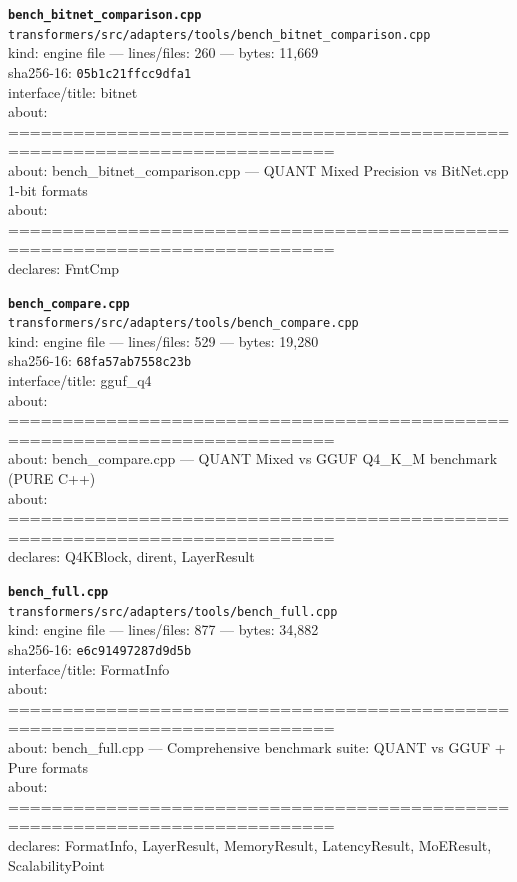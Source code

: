 \noindent\textbf{\texttt{bench\_bitnet\_comparison.cpp}}\\
\texttt{transformers/src/adapters/tools/bench\_bitnet\_comparison.cpp}\\
kind: engine file --- lines/files: 260 --- bytes: 11,669\\
sha256-16: \texttt{05b1c21ffcc9dfa1}\\
interface/title: bitnet\\
about: ============================================================================\\
about: bench\_bitnet\_comparison.cpp — QUANT Mixed Precision vs BitNet.cpp 1-bit formats\\
about: ============================================================================\\
declares: FmtCmp\\
\vspace*{6.0pt}

\noindent\textbf{\texttt{bench\_compare.cpp}}\\
\texttt{transformers/src/adapters/tools/bench\_compare.cpp}\\
kind: engine file --- lines/files: 529 --- bytes: 19,280\\
sha256-16: \texttt{68fa57ab7558c23b}\\
interface/title: gguf\_q4\\
about: ============================================================================\\
about: bench\_compare.cpp — QUANT Mixed vs GGUF Q4\_K\_M benchmark (PURE C++)\\
about: ============================================================================\\
declares: Q4KBlock, dirent, LayerResult\\
\vspace*{6.0pt}
\newpage

\noindent\textbf{\texttt{bench\_full.cpp}}\\
\texttt{transformers/src/adapters/tools/bench\_full.cpp}\\
kind: engine file --- lines/files: 877 --- bytes: 34,882\\
sha256-16: \texttt{e6c91497287d9d5b}\\
interface/title: FormatInfo\\
about: ============================================================================\\
about: bench\_full.cpp — Comprehensive benchmark suite: QUANT vs GGUF + Pure formats\\
about: ============================================================================\\
declares: FormatInfo, LayerResult, MemoryResult, LatencyResult, MoEResult, ScalabilityPoint\\
\vspace*{6.0pt}

